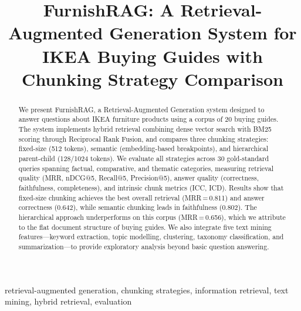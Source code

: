 \documentclass[conference]{IEEEtran}
\begin{document}
\title{FurnishRAG: A Retrieval-Augmented Generation System for IKEA Buying Guides with Chunking Strategy Comparison}

\author{
\and
{}
}

\maketitle

\begin{abstract}
We present FurnishRAG, a Retrieval-Augmented Generation system designed to answer questions about IKEA furniture products using a corpus of 20 buying guides. The system implements hybrid retrieval combining dense vector search with BM25 scoring through Reciprocal Rank Fusion, and compares three chunking strategies: fixed-size (512 tokens), semantic (embedding-based breakpoints), and hierarchical parent-child (128/1024 tokens). We evaluate all strategies across 30 gold-standard queries spanning factual, comparative, and thematic categories, measuring retrieval quality (MRR, nDCG@5, Recall@5, Precision@5), answer quality (correctness, faithfulness, completeness), and intrinsic chunk metrics (ICC, ICD). Results show that fixed-size chunking achieves the best overall retrieval (MRR\,=\,0.811) and answer correctness (0.642), while semantic chunking leads in faithfulness (0.802). The hierarchical approach underperforms on this corpus (MRR\,=\,0.656), which we attribute to the flat document structure of buying guides. We also integrate five text mining features---keyword extraction, topic modelling, clustering, taxonomy classification, and summarization---to provide exploratory analysis beyond basic question answering.
\end{abstract}

\begin{IEEEkeywords}
retrieval-augmented generation, chunking strategies, information retrieval, text mining, hybrid retrieval, evaluation
\end{IEEEkeywords}
\end{document}
